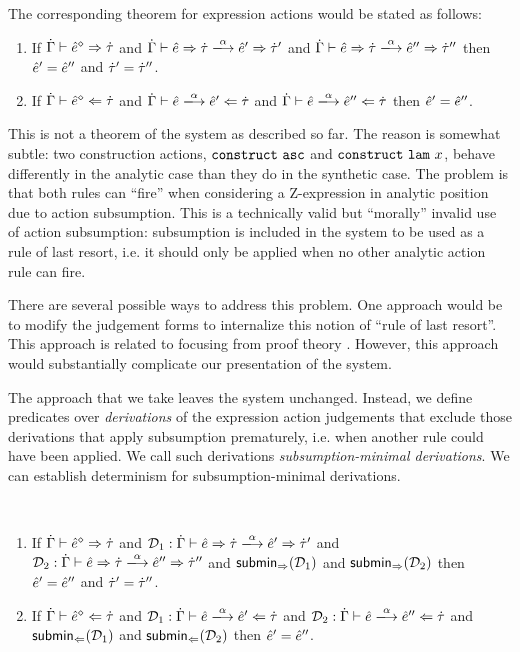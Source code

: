 The corresponding theorem for expression actions would be stated as follows:
  \begin{enumerate}[itemsep=0px,partopsep=0px,topsep=0px]
  \item If $\dot{\Gamma} \vdash \hat{e}^{\diamond} \Rightarrow \dot{\tau}$ and
    $\performSyn{\hGamma}{\zexp}{\htau}{\alpha}{\zexp'}{\htau'}$ and
    $\performSyn{\hGamma}{\zexp}{\htau}{\alpha}{\zexp''}{\htau''}$ then
    $\hat{e}' = \hat{e}''$ and $\dot{\tau}' = \dot{\tau}''$.
  \item If $\dot{\Gamma} \vdash \hat{e}^{\diamond} \Leftarrow \dot{\tau}$ and
    $\performAna{\hGamma}{\zexp}{\htau}{\alpha}{\zexp'}$ and
    $\performAna{\hGamma}{\zexp}{\htau}{\alpha}{\zexp''}$ then $\hat{e}' =
    \hat{e}''$.
  \end{enumerate}

This is not a theorem of the system as described so far. The reason
is somewhat subtle: two construction actions,
$\mathtt{construct}~\mathtt{asc}$ and $\mathtt{construct}~\mathtt{lam}~x$, behave differently in the
analytic case than they do in the synthetic case. The problem is that both rules can  
``fire'' when considering a Z-expression in analytic position due to action subsumption. This is a technically valid but ``morally'' invalid use of action subsumption: subsumption is included in the system to be used as a rule of last resort, i.e. it should only be applied when no other analytic action rule can fire.

There are several possible ways to address this problem. One approach would be to modify the judgement forms to internalize this notion of ``rule of last resort''. This approach is related to focusing from proof theory \cite{Simmons11tr}. However, this approach would substantially complicate our presentation of the system.

The approach that we take leaves the system unchanged. Instead, we define predicates over \emph{derivations} of the expression action judgements that exclude those derivations that apply subsumption prematurely, i.e. when another rule could have been applied. We call such derivations \emph{subsumption-minimal derivations}. We can establish determinism for subsumption-minimal derivations.
\begin{theorem} ~
  \begin{enumerate}[itemsep=0px,partopsep=0px,topsep=0px]
  \item If $\dot{\Gamma} \vdash \hat{e}^{\diamond} \Rightarrow \dot{\tau}$ and
    $\mathcal{D}_1 : \performSyn{\hGamma}{\zexp}{\htau}{\alpha}{\zexp'}{\htau'}$ and
    $\mathcal{D}_2 : \performSyn{\hGamma}{\zexp}{\htau}{\alpha}{\zexp''}{\htau''}$ and $\mathsf{submin}_{\Rightarrow}(\mathcal{D}_1)$ and $\mathsf{submin}_{\Rightarrow}(\mathcal{D}_2)$ then
    $\hat{e}' = \hat{e}''$ and $\dot{\tau}' = \dot{\tau}''$.
  \item If $\dot{\Gamma} \vdash \hat{e}^{\diamond} \Leftarrow \dot{\tau}$ and
    $\mathcal{D}_1 : \performAna{\hGamma}{\zexp}{\htau}{\alpha}{\zexp'}$ and
    $\mathcal{D}_2 : \performAna{\hGamma}{\zexp}{\htau}{\alpha}{\zexp''}$ and $\mathsf{submin}_{\Leftarrow}(\mathcal{D}_1)$ and $\mathsf{submin}_{\Leftarrow}(\mathcal{D}_2)$ then $\hat{e}' =
    \hat{e}''$.
  \end{enumerate}
\end{theorem}

